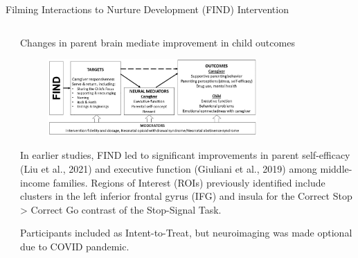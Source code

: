 \documentclass[final]{beamer}
\begin{document}
\begin{frame}[t]
\begin{columns}[t]
\begin{column}{\textwidth}
\begin{block}{Filming Interactions to Nurture Development (FIND) Intervention}
\begin{columns}[t]
\begin{column}{0.48\textwidth}
      \end{column}

      \begin{column}{0.48\textwidth}

    \begin{block}{Changes in parent brain mediate improvement in child outcomes}
        \begin{figure}[ht]
          \centering
          \includegraphics[clip, width=0.75\textwidth]{model.png}
          \label{fig:model}
        \end{figure}
        In earlier studies, FIND led to significant improvements in parent self-efficacy (Liu et al., 2021) and executive function (Giuliani et al., 2019) among middle-income families. 
        Regions of Interest (ROIs) previously identified include clusters in the left inferior frontal gyrus (IFG) and insula for the Correct Stop > Correct Go contrast of the Stop-Signal Task.
        \end{block}

    \begin{block}{Participants included as Intent-to-Treat, but neuroimaging was made optional due to COVID pandemic.}

\end{block}
\end{column}
\end{columns}
\end{block}
\end{column}
\end{columns}
\end{frame}
\end{document}
